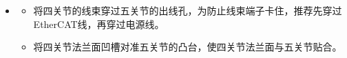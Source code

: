 \documentclass[a4paper,11pt,english,openany,oneside]{sphinxmanual}
\begin{document}
\begin{itemize}
\begin{itemize}
\begin{figure}[H]
\centering
\capstart

\noindent{}
\caption{放入径向螺钉定位套}\label{\detokenize{_u66f4_u6362_u5173_u8282:id90}}\end{figure}

\item {} 
\sphinxAtStartPar
使用内六角螺丝刀按对角顺序拧紧4颗螺栓。螺栓的规格参考 {\hyperref[\detokenize{_u66f4_u6362_u5173_u8282:id9}]{}} 。

\end{itemize}
\begin{quote}

\begin{figure}[H]
\centering
\capstart

\noindent{}
\caption{安装四关节螺栓}\label{\detokenize{_u66f4_u6362_u5173_u8282:id91}}\end{figure}
\end{quote}
\begin{itemize}
\item {} 
\sphinxAtStartPar
将剩余的8颗较短的螺栓放入四关节的螺纹孔中，并使用内六角螺丝刀按对角顺序拧紧螺栓。螺栓的规格参考 {\hyperref[\detokenize{_u66f4_u6362_u5173_u8282:id9}]{}} 。

\end{itemize}
\begin{quote}

\begin{figure}[H]
\centering
\capstart

\noindent{}
\caption{安装四关节螺栓}\label{\detokenize{_u66f4_u6362_u5173_u8282:id92}}\end{figure}
\end{quote}

\item {} 
\sphinxAtStartPar
{}
\begin{itemize}
\item {} 
\sphinxAtStartPar
将四关节的线束穿过五关节的出线孔，为防止线束端子卡住，推荐先穿过EtherCAT线，再穿过电源线。

\item {} 
\sphinxAtStartPar
将四关节法兰面凹槽对准五关节的凸台，使四关节法兰面与五关节贴合。


\end{itemize}
\end{itemize}
\end{document}

